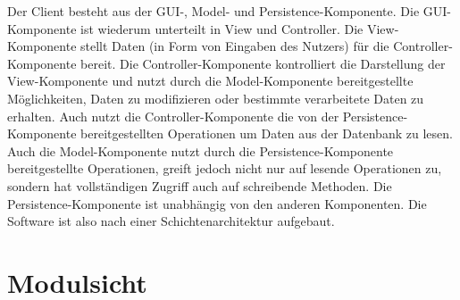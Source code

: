 \documentclass[fontsize=12pt,paper=a4,twoside]{scrartcl}
\begin{document}
Der Client besteht aus der GUI-, Model- und Persistence-Komponente. Die GUI-Komponente ist wiederum unterteilt in View und Controller. Die View-Komponente stellt Daten (in Form von Eingaben des Nutzers) für die Controller-Komponente bereit. Die Controller-Komponente kontrolliert die Darstellung der View-Komponente und nutzt durch die Model-Komponente bereitgestellte Möglichkeiten, Daten zu modifizieren oder bestimmte verarbeitete Daten zu erhalten. Auch nutzt die Controller-Komponente die von der Persistence-Komponente bereitgestellten Operationen um Daten aus der Datenbank zu lesen. Auch die Model-Komponente nutzt durch die Persistence-Komponente bereitgestellte Operationen, greift jedoch nicht nur auf lesende Operationen zu, sondern hat vollständigen Zugriff auch auf schreibende Methoden. Die Persistence-Komponente ist unabhängig von den anderen Komponenten. Die Software ist also nach einer Schichtenarchitektur aufgebaut.

\section{Modulsicht}
\label{sec:modulsicht}
\end{document}
